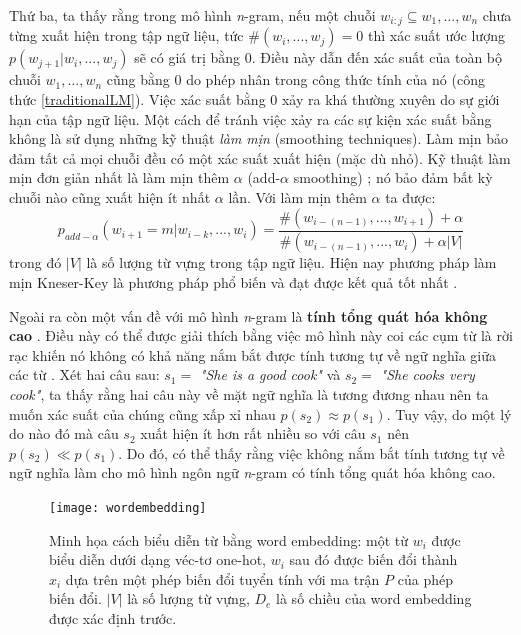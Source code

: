 Thứ ba, ta thấy rằng trong mô hình \textit{n}-gram, nếu một chuỗi $w_{i:j} \subseteq w_1,...,w_n$ chưa từng xuất hiện trong tập ngữ liệu, tức $\# \left(w_i,...,w_j \right) = 0$ thì xác suất ước lượng $p(w_{j+1}|w_i,...,w_j)$ sẽ có giá trị bằng 0. Điều này dẫn đến xác suất của toàn bộ chuỗi $w_1,...,w_n$ cũng bằng 0 do phép nhân trong công thức tính của nó (công thức \ref{traditionalLM}). Việc xác suất bằng 0 xảy ra khá thường xuyên do sự giới hạn của tập ngữ liệu. Một cách để tránh việc xảy ra các sự kiện xác suất bằng không là sử dụng những kỹ thuật \textit{làm mịn} (smoothing techniques). Làm mịn bảo đảm tất cả mọi chuỗi đều có một xác suất xuất hiện (mặc dù nhỏ). Kỹ thuật làm mịn đơn giản nhất là làm mịn thêm $\alpha$ (add-$\alpha$ smoothing) \cite{goodman2001}; nó bảo đảm bất kỳ chuỗi nào cũng xuất hiện ít nhất $\alpha$ lần. Với làm mịn thêm $\alpha$ ta được:
\begin{equation} \label{ngramLMWithSmoothing}
	p_{add-\alpha} \left(w_{i+1}=m|w_{i-k},...,w_{i} \right) = \frac{\# \left(w_{i-(n-1)},...,w_{i+1} \right) + \alpha}{\# \left(w_{i-(n-1)},...,w_{i} \right) + \alpha \left|V \right| }
\end{equation}
trong đó $\left|V \right|$ là số lượng từ vựng trong tập ngữ liệu. Hiện nay phương pháp làm mịn Kneser-Key là phương pháp phổ biến và đạt được kết quả tốt nhất \cite{jurafsky2000}.

Ngoài ra còn một vấn đề với mô hình \textit{n}-gram là \textbf{tính tổng quát hóa không cao} \cite{bengioLM2003}. Điều này có thể được giải thích bằng việc mô hình này coi các cụm từ là rời rạc khiến nó không có khả năng nắm bắt được tính tương tự về ngữ nghĩa giữa các từ \cite{bengioLM2003}. Xét hai câu sau: $s_1 =$ \textit{"She is a good cook"} và $s_2 =$ \textit{"She cooks very cook"}, ta thấy rằng hai câu này về mặt ngữ nghĩa là tương đương nhau nên ta muốn xác suất của chúng cũng xấp xỉ nhau $p(s_2) \approx p(s_1)$. Tuy vậy, do một lý do nào đó mà câu $s_2$ xuất hiện ít hơn rất nhiều so với câu $s_1$ nên $p(s_2) \ll p(s_1)$. Do đó, có thể thấy rằng việc không nắm bắt tính tương tự về ngữ nghĩa làm cho mô hình ngôn ngữ \textit{n}-gram có tính tổng quát hóa không cao.

\begin{figure}
	\centering
	\texttt{[image: wordembedding]}
	\caption[Minh họa cách biểu diễn từ bằng word embedding]{Minh họa cách biểu diễn từ bằng word embedding: một từ $w_i$ được biểu diễn dưới dạng véc-tơ one-hot, $w_i$ sau đó được biến đổi thành $x_i$ dựa trên một phép biến đổi tuyển tính với ma trận $P$ của phép biến đổi. $|V|$ là số lượng từ vựng, $D_e$ là số chiều của word embedding được xác định trước.}
	\label{fig_wordembedding}
\end{figure}

